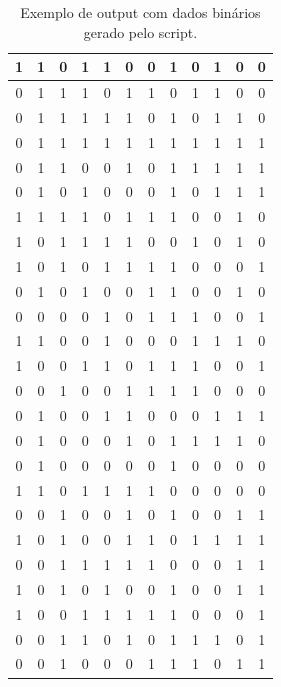 \begin{table}[H]
\caption{Exemplo de output com dados binários gerado pelo script.}
\label{q.output2}
\centering

\begin{tabular}{|c|c|c|c|c|c|c|c|c|c|c|c|}
\hline
1 & 1 & 0 & 1 & 1 & 0 & 0 & 1 & 0 & 1 & 0 & 0 \\ \hline
0 & 1 & 1 & 1 & 0 & 1 & 1 & 0 & 1 & 1 & 0 & 0 \\ \hline
0 & 1 & 1 & 1 & 1 & 1 & 0 & 1 & 0 & 1 & 1 & 0 \\ \hline
0 & 1 & 1 & 1 & 1 & 1 & 1 & 1 & 1 & 1 & 1 & 1 \\ \hline
0 & 1 & 1 & 0 & 0 & 1 & 0 & 1 & 1 & 1 & 1 & 1 \\ \hline
0 & 1 & 0 & 1 & 0 & 0 & 0 & 1 & 0 & 1 & 1 & 1 \\ \hline
1 & 1 & 1 & 1 & 0 & 1 & 1 & 1 & 0 & 0 & 1 & 0 \\ \hline
1 & 0 & 1 & 1 & 1 & 1 & 0 & 0 & 1 & 0 & 1 & 0 \\ \hline
1 & 0 & 1 & 0 & 1 & 1 & 1 & 1 & 0 & 0 & 0 & 1 \\ \hline
0 & 1 & 0 & 1 & 0 & 0 & 1 & 1 & 0 & 0 & 1 & 0 \\ \hline
0 & 0 & 0 & 0 & 1 & 0 & 1 & 1 & 1 & 0 & 0 & 1 \\ \hline
1 & 1 & 0 & 0 & 1 & 0 & 0 & 0 & 1 & 1 & 1 & 0 \\ \hline
1 & 0 & 0 & 1 & 1 & 0 & 1 & 1 & 1 & 0 & 0 & 1 \\ \hline
0 & 0 & 1 & 0 & 0 & 1 & 1 & 1 & 1 & 0 & 0 & 0 \\ \hline
0 & 1 & 0 & 0 & 1 & 1 & 0 & 0 & 0 & 1 & 1 & 1 \\ \hline
0 & 1 & 0 & 0 & 0 & 1 & 0 & 1 & 1 & 1 & 1 & 0 \\ \hline
0 & 1 & 0 & 0 & 0 & 0 & 0 & 1 & 0 & 0 & 0 & 0 \\ \hline
1 & 1 & 0 & 1 & 1 & 1 & 1 & 0 & 0 & 0 & 0 & 0 \\ \hline
0 & 0 & 1 & 0 & 0 & 1 & 0 & 1 & 0 & 0 & 1 & 1 \\ \hline
1 & 0 & 1 & 0 & 0 & 1 & 1 & 0 & 1 & 1 & 1 & 1 \\ \hline
0 & 0 & 1 & 1 & 1 & 1 & 1 & 0 & 0 & 0 & 1 & 1 \\ \hline
1 & 0 & 1 & 0 & 1 & 0 & 0 & 1 & 0 & 0 & 1 & 1 \\ \hline
1 & 0 & 0 & 1 & 1 & 1 & 1 & 1 & 0 & 0 & 0 & 1 \\ \hline
0 & 0 & 1 & 1 & 0 & 1 & 0 & 1 & 1 & 1 & 0 & 1 \\ \hline
0 & 0 & 1 & 0 & 0 & 0 & 1 & 1 & 1 & 0 & 1 & 1 \\ \hline

\end{tabular}
\end{table}

